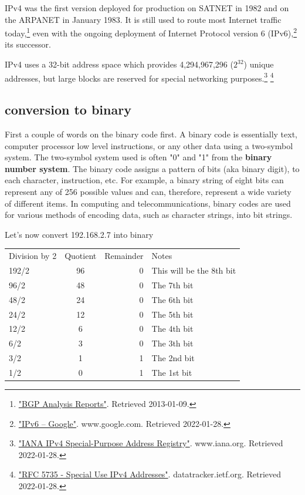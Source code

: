 \documentclass[a4paper,12pt]{book}
\begin{document}
IPv4 was the first version deployed for production on SATNET in 1982 and on the ARPANET in January 1983. It is still used to route most Internet traffic today,\footnote{\label{note2}\href{http://bgp.potaroo.net/index-bgp.html}{"BGP Analysis Reports"}. Retrieved 2013-01-09.} even with the ongoing deployment of Internet Protocol version 6 (IPv6),\footnote{\label{note3}\href{https://www.google.com/intl/en/ipv6/statistics.html}{"IPv6 – Google"}. www.google.com. Retrieved 2022-01-28.} its successor.

IPv4 uses a 32-bit address space which provides 4,294,967,296 ($2^{32}$) unique addresses, but large blocks are reserved for special networking purposes.\footnote{\label{note4}\href{https://www.iana.org/assignments/iana-ipv4-special-registry/iana-ipv4-special-registry.xhtml}{"IANA IPv4 Special-Purpose Address Registry"}. www.iana.org. Retrieved 2022-01-28.} \footnote{\label{note5}\href{https://datatracker.ietf.org/doc/html/rfc5735}{"RFC 5735 - Special Use IPv4 Addresses"}. datatracker.ietf.org. Retrieved 2022-01-28.}




\subsection{conversion to binary}

First a couple of words on the binary code first. A binary code is essentially text, computer processor low level instructions, or any other data using a two-symbol system. The two-symbol system used is often "0" and "1" from the \textbf{binary number system}. The binary code assigns a pattern of bits (aka binary digit), to each character, instruction, etc. For example, a binary string of eight bits can represent any of 256 possible values and can, therefore, represent a wide variety of different items.
In computing and telecommunications, binary codes are used for various methods of encoding data, such as character strings, into bit strings. 

Let's now convert 192.168.2.7 into binary
\newline

\begin{tabular}{||l|c|r|p{5cm}||}
    Division by 2 & Quotient & Remainder & Notes \\
    192/2 & 96 & 0 & This will be the 8th bit \\
    96/2 & 48 & 0 & The 7th bit \\
    48/2 & 24 & 0 & The 6th bit \\
    24/2 & 12 & 0 & The 5th bit \\
    12/2 & 6 & 0 & The 4th bit \\
    6/2 & 3 & 0 & The 3th bit \\
    3/2 & 1 & 1 & The 2nd bit \\
    1/2 & 0 & 1 & The 1st bit \\
\end{tabular}
\end{document}

